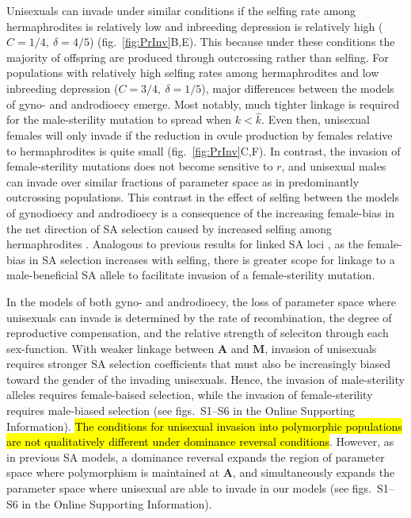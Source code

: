 \documentclass[9pt,twocolumn,twoside,lineno]{gsajnl}
\begin{document}
Unisexuals can invade under similar conditions if the selfing rate among hermaphrodites is relatively low and inbreeding depression is relatively high ($C = 1/4,~\delta = 4/5$) (fig.~\ref{fig:PrInv}B,E). This because under these conditions the majority of offspring are produced through outcrossing rather than selfing. For populations with relatively high selfing rates among hermaphrodites and low inbreeding depression ($C = 3/4,~\delta = 1/5$), major differences between the models of gyno- and androdioecy emerge. Most notably, much tighter linkage is required for the male-sterility mutation to spread when $k < \hat{k}$. Even then, unisexual females will only invade if the reduction in ovule production by females relative to hermaphrodites is quite small (fig.~\ref{fig:PrInv}C,F). In contrast, the invasion of female-sterility mutations does not become sensitive to $r$, and unisexual males can invade over similar fractions of parameter space as in predominantly outcrossing populations. This contrast in the effect of selfing between the models of gynodioecy and androdioecy is a consequence of the increasing female-bias in the net direction of SA selection caused by increased selfing among hermaphrodites \citep{Charlesworth1978a,JordanConnallon2014,Olito2016}. Analogous to previous results for linked SA loci \citep{Olito2016}, as the female-bias in SA selection increases with selfing, there is greater scope for linkage to a male-beneficial SA allele to facilitate invasion of a female-sterility mutation.

In the models of both gyno- and androdioecy, the loss of parameter space where unisexuals can invade is determined by the rate of recombination, the degree of reproductive compensation, and the relative strength of seleciton through each sex-function. With weaker linkage between $\mathbf{A}$ and $\mathbf{M}$, invasion of unisexuals requires stronger SA selection coefficients that must also be increasingly biased toward the gender of the invading unisexuals. Hence, the invasion of male-sterility alleles requires female-baised selection, while the invasion of female-sterility requires male-biased selection (see figs.~S1--S6 in the Online Supporting Information). \hl{The conditions for unisexual invasion into polymorphic populations are not qualitatively different under dominance reversal conditions}. However, as in previous SA models, a dominance reversal expands the region of parameter space where polymorphism is maintained at $\mathbf{A}$, and simultaneously expands the parameter space where unisexual are able to invade in our models (see figs.~S1--S6 in the Online Supporting Information).
\end{document}
